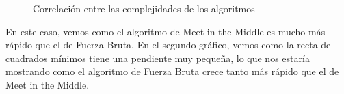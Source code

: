 \begin{figure}[H]
\begin{minipage}{0.5\textwidth}
     \caption{Correlación entre las complejidades de los algoritmos}
   \end{minipage}
\end{figure}

En este caso, vemos como el algoritmo de Meet in the Middle es mucho más rápido que el de Fuerza Bruta. En el segundo gráfico, vemos como la recta de cuadrados mínimos tiene una pendiente muy pequeña, lo que nos estaría mostrando como el algoritmo de Fuerza Bruta crece tanto más rápido que el de Meet in the Middle.
